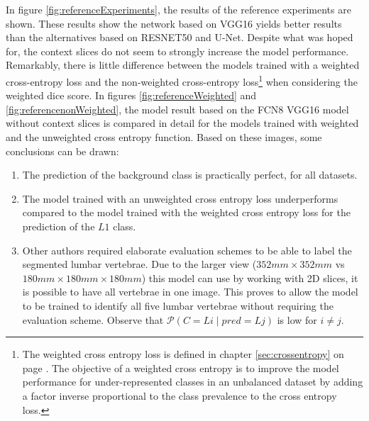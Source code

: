 \par{
    In figure \ref{fig:referenceExperiments}, the results of the reference experiments are shown.
    These results show the network based on VGG16 yields better results than the alternatives based on RESNET50 and U-Net.
    Despite what was hoped for, the context slices do not seem to strongly increase the model performance.
    Remarkably, there is little difference between the models trained with a weighted cross-entropy loss and the non-weighted cross-entropy loss\footnote{
        The weighted cross entropy loss is defined in chapter \ref{sec:crossentropy} on page \pageref{sec:crossentropy}. 
        The objective of a weighted cross entropy is to improve the model performance for under-represented classes in an unbalanced dataset by adding a factor inverse proportional to the class prevalence to the cross entropy loss.
    } when considering the weighted dice score.
    In figures \ref{fig:referenceWeighted} and \ref{fig:referencenonWeighted}, the model result based on the FCN8 VGG16 model without context slices is compared in detail for the models trained with weighted and the unweighted cross entropy function.
    Based on these images, some conclusions can be drawn:
    \begin{enumerate}
        \item The prediction of the background class is practically perfect, for all datasets.
        \item The model trained with an unweighted cross entropy loss underperforms compared to the model trained with the weighted cross entropy loss for the prediction of the $L1$ class.
        \item Other authors \cite{Lessmann2018,Chuang2019} required elaborate evaluation schemes to be able to label the segmented lumbar vertebrae. 
        Due to the larger view ($352 mm \times 352 mm$ vs $180 mm \times 180 mm \times 180 mm$) this model can use by working with 2D slices, it is possible to have all vertebrae in one image.
        This proves to allow the model to be trained to identify all five lumbar vertebrae without requiring the evaluation scheme.
        Observe that $\mathcal{P}(C = Li \mid pred = Lj)$ is low for $i\neq j$.
    \end{enumerate}
}

